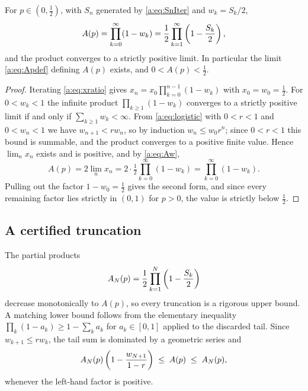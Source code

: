 \begin{proposition}
\label{a:prop:product}
For $p\in(0,\tfrac12)$, with $S_n$ generated by \cref{a:eq:SnIter} and
$w_k = S_k/2$,
\begin{equation}
\label{a:eq:prodFormula}
A(p) = \prod_{k=0}^{\infty}(1-w_k)
= \frac12\prod_{k=1}^{\infty}\left(1-\frac{S_k}{2}\right) ,
\end{equation}
and the product converges to a strictly positive limit. In particular the limit
\cref{a:eq:Apdef} defining $A(p)$ exists, and $0<A(p)<\tfrac12$.
\end{proposition}

\begin{proof}
Iterating \cref{a:eq:xratio} gives $x_n = x_0\prod_{k=0}^{n-1}(1-w_k)$ with
$x_0 = w_0 = \tfrac12$. For $0<w_k<1$ the infinite product $\prod_{k\ge1}(1-w_k)$
converges to a strictly positive limit if and only if $\sum_{k\ge1}w_k<\infty$.
From \cref{a:eq:logistic} with $0<r<1$ and $0<w_n<1$ we have $w_{n+1}<rw_n$, so by
induction $w_n\le w_0r^n$; since $0<r<1$ this bound is summable, and the product
converges to a positive finite value. Hence $\lim_nx_n$ exists and is positive, and
by \cref{a:eq:Aw},
\begin{equation*}
A(p) = 2\lim_nx_n = 2\cdot\tfrac12\prod_{k=0}^{\infty}(1-w_k)
= \prod_{k=0}^{\infty}(1-w_k) .
\end{equation*}
Pulling out the factor $1-w_0 = \tfrac12$ gives the second form, and since every
remaining factor lies strictly in $(0,1)$ for $p>0$, the value is strictly below
$\tfrac12$.
\end{proof}

\subsection{A certified truncation}
\label{a:sec:producttail}

The partial products
\begin{equation}
\label{a:eq:partialproduct}
A_N(p) = \frac12\prod_{k=1}^{N}\left(1-\frac{S_k}{2}\right)
\end{equation}
decrease monotonically to $A(p)$, so every truncation is a rigorous upper bound. A
matching lower bound follows from the elementary inequality
$\prod_k(1-a_k)\ge1-\sum_ka_k$ for $a_k\in[0,1]$ applied to the discarded tail.
Since $w_{k+1}\le rw_k$, the tail sum is dominated by a geometric series and
\begin{equation}
\label{a:eq:producttailbound}
A_N(p)\left(1-\frac{w_{N+1}}{1-r}\right) \;\le\; A(p) \;\le\; A_N(p),
\end{equation}
whenever the left-hand factor is positive.

